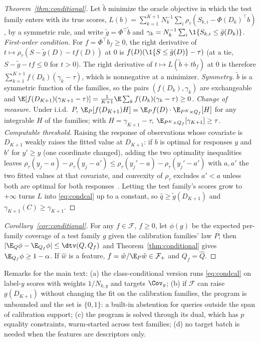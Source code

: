 \begin{proof}[Theorem~\ref{thm:conditional}]
Let $\tilde b$ minimize the oracle objective in which the test family enters with its true scores, $L(b)=\sum_{k=1}^{K+1}N_k^{-1}\sum_i\rho_\tau(S_{k,i}-\Phi(D_k)^\top b)$, by a symmetric rule, and write $\tilde g=\Phi^\top\tilde b$ and $\gamma_k=N_k^{-1}\sum_i\1\{S_{k,i}\le\tilde g(D_k)\}$.
\emph{First-order condition.} For $f=\Phi^\top b_f\ge0$, the right derivative of $t\mapsto\rho_\tau(S-\tilde g(D)-tf(D))$ at $0$ is $f(D)(\1\{S\le\tilde g(D)\}-\tau)$ (at a tie, $S-\tilde g-tf\le0$ for $t>0$). The right derivative of $t\mapsto L(\tilde b+tb_f)$ at $0$ is therefore $\sum_{k=1}^{K+1}f(D_k)(\gamma_k-\tau)$, which is nonnegative at a minimizer.
\emph{Symmetry.} $\tilde b$ is a symmetric function of the families, so the pairs $(f(D_k),\gamma_k)$ are exchangeable and $\E[f(D_{K+1})(\gamma_{K+1}-\tau)]=\frac1{K+1}\E\sum_kf(D_k)(\gamma_k-\tau)\ge0$.
\emph{Change of measure.} Under i.i.d.\ $P$, $\E_P[f(D_{K+1})H]=\E_Pf(D)\cdot\E_{P^K\times Q_f}[H]$ for any integrable $H$ of the families; with $H=\gamma_{K+1}-\tau$, $\E_{P^K\times Q_f}[\gamma_{K+1}]\ge\tau$.
\emph{Computable threshold.} Raising the response of observations whose covariate is $D_{K+1}$ weakly raises the fitted value at $D_{K+1}$: if $b$ is optimal for responses $y$ and $b'$ for $y'\ge y$ (one coordinate changed), adding the two optimality inequalities leaves $\rho_\tau(y_j-a)-\rho_\tau(y_j-a')\le\rho_\tau(y_j'-a)-\rho_\tau(y_j'-a')$ with $a,a'$ the two fitted values at that covariate, and convexity of $\rho_\tau$ excludes $a'<a$ unless both are optimal for both responses~\cite{gibbs2025conformal}. Letting the test family's scores grow to $+\infty$ turns $L$ into \eqref{eq:condcal} up to a constant, so $\hat q\ge\tilde g(D_{K+1})$ and $\gamma_{K+1}(C)\ge\gamma_{K+1}$.
\end{proof}

\begin{proof}[Corollary~\ref{cor:conditional}]
For any $f\in\mathcal{F}$, $f\ge0$, let $\phi(g)$ be the expected per-family coverage of a test family $g$ given the calibration families' law $P$; then $|\E_Q\phi-\E_{Q_f}\phi|\le\dtv(Q,Q_f)$ and Theorem~\ref{thm:conditional} gives $\E_{Q_f}\phi\ge1-\alpha$. If $\hat w$ is a feature, $f=\hat w/\E_P\hat w\in\mathcal{F}_+$ and $Q_f=\hat Q$.
\end{proof}

Remarks for the main text: (a) the class-conditional version runs \eqref{eq:condcal} on label-$y$ scores with weights $1/N_{k,y}$ and targets $\Cov_y$; (b) if $\mathcal{F}$ can raise $g(D_{K+1})$ without changing the fit on the calibration families, the program is unbounded and the set is $\{0,1\}$: a built-in abstention for queries outside the span of calibration support; (c) the program is solved through its dual, which has $p$ equality constraints, warm-started across test families; (d) no target batch is needed when the features are descriptors only.
